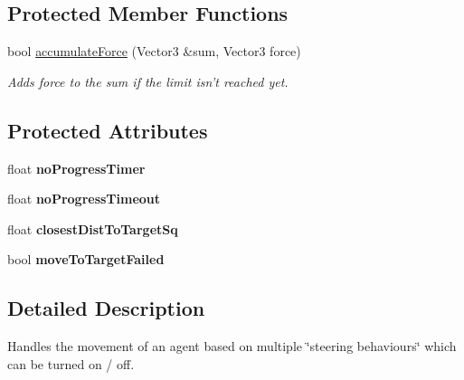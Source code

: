\subsection*{\-Protected \-Member \-Functions}
\begin{DoxyCompactItemize}
\item 
\hypertarget{classAIMovementController_af3f6ed392153acfb8754adcbe04c2d4d}{
bool \hyperlink{classAIMovementController_af3f6ed392153acfb8754adcbe04c2d4d}{accumulate\-Force} (\-Vector3 \&sum, \-Vector3 force)}
\label{d2/d30/classAIMovementController_af3f6ed392153acfb8754adcbe04c2d4d}

\begin{DoxyCompactList}\small\item\em \-Adds force to the sum if the limit isn't reached yet. \end{DoxyCompactList}\end{DoxyCompactItemize}
\subsection*{\-Protected \-Attributes}
\begin{DoxyCompactItemize}
\item 
\hypertarget{classAIMovementController_a165d7b0c4d23378409c82fb423f17c61}{
float {\bfseries no\-Progress\-Timer}}
\label{d2/d30/classAIMovementController_a165d7b0c4d23378409c82fb423f17c61}

\item 
\hypertarget{classAIMovementController_aaff982f6034b340f085c9c23d212717c}{
float {\bfseries no\-Progress\-Timeout}}
\label{d2/d30/classAIMovementController_aaff982f6034b340f085c9c23d212717c}

\item 
\hypertarget{classAIMovementController_a2aff1de5373e46c95220d18d77a39c82}{
float {\bfseries closest\-Dist\-To\-Target\-Sq}}
\label{d2/d30/classAIMovementController_a2aff1de5373e46c95220d18d77a39c82}

\item 
\hypertarget{classAIMovementController_a54dd60f147738a7e194f980dd901cce9}{
bool {\bfseries move\-To\-Target\-Failed}}
\label{d2/d30/classAIMovementController_a54dd60f147738a7e194f980dd901cce9}

\end{DoxyCompactItemize}


\subsection{\-Detailed \-Description}
\-Handles the movement of an agent based on multiple \char`\"{}steering behaviours\char`\"{} which can be turned on / off. 

